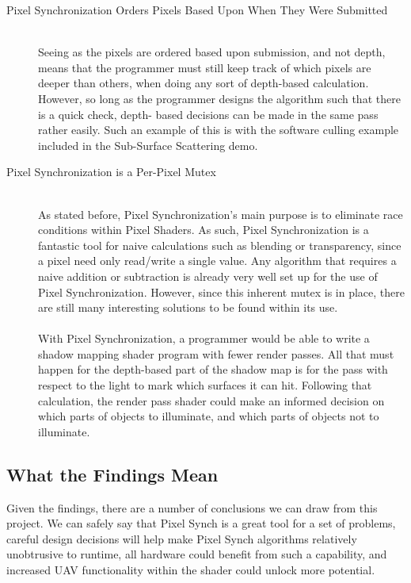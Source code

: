 \documentclass[a4paper, 12pt]{article}
\begin{document}
\begin{description}
\item[Pixel Synchronization Orders Pixels Based Upon When They Were Submitted] \hfill \\

Seeing as the pixels are ordered based upon submission, and not depth, means
that the programmer must still keep track of which pixels are deeper than
others, when doing any sort of depth-based calculation. However, so long as
the programmer designs the algorithm such that there is a quick check, depth-
based decisions can be made in the same pass rather easily. Such an example of
this is with the software culling example included in the Sub-Surface
Scattering demo.

\item[Pixel Synchronization is a Per-Pixel Mutex] \hfill \\

As stated before, Pixel Synchronization's main purpose is to eliminate race
conditions within Pixel Shaders. As such, Pixel Synchronization is a fantastic
tool for naive calculations such as blending or transparency, since a pixel
need only read/write a single value. Any algorithm that requires a naive
addition or subtraction is already very well set up for the use of Pixel
Synchronization. However, since this inherent mutex is in place, there are
still many interesting solutions to be found within its use. \\ \\ With Pixel
Synchronization, a programmer would be able to write a shadow mapping shader
program with fewer render passes. All that must happen for the depth-based
part of the shadow map is for the pass with respect to the light to mark which
surfaces it can hit. Following that calculation, the render pass shader could
make an informed decision on which parts of objects to illuminate, and which
parts of objects not to illuminate.

\end{description}

\subsection{What the Findings Mean}

Given the findings, there are a number of conclusions we can draw from this
project. We can safely say that Pixel Synch is a great tool for a set of
problems, careful design decisions will help make Pixel Synch algorithms
relatively unobtrusive to runtime, all hardware could benefit from such a
capability, and increased UAV functionality within the shader could unlock
more potential.
\end{document}
